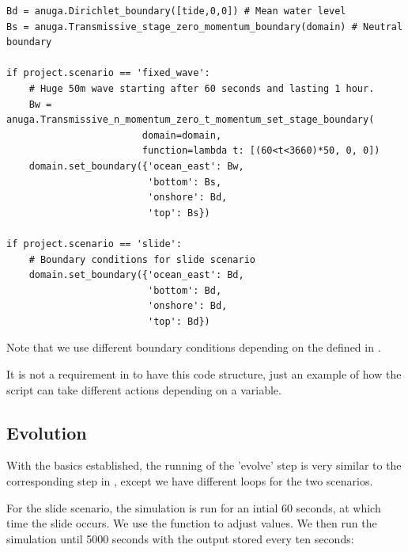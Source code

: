 \documentclass{manual}
\begin{document}
\begin{verbatim}
Bd = anuga.Dirichlet_boundary([tide,0,0]) # Mean water level
Bs = anuga.Transmissive_stage_zero_momentum_boundary(domain) # Neutral boundary

if project.scenario == 'fixed_wave':
    # Huge 50m wave starting after 60 seconds and lasting 1 hour.
    Bw = anuga.Transmissive_n_momentum_zero_t_momentum_set_stage_boundary(
                        domain=domain, 
                        function=lambda t: [(60<t<3660)*50, 0, 0])
    domain.set_boundary({'ocean_east': Bw,
                         'bottom': Bs,
                         'onshore': Bd,
                         'top': Bs})

if project.scenario == 'slide':
    # Boundary conditions for slide scenario
    domain.set_boundary({'ocean_east': Bd,
                         'bottom': Bd,
                         'onshore': Bd,
                         'top': Bd})
\end{verbatim}

Note that we use different boundary conditions depending on the 
defined in .

It is not a requirement in \anuga to have this code structure, just an example of
how the script can take different actions depending on a variable.

\subsection{Evolution}

With the basics established, the running of the 'evolve' step is
very similar to the corresponding step in , except we have different 
loops for the two scenarios.

For the slide scenario, the simulation is run for an intial 60 seconds, at which time
the slide occurs.  We use the function  to adjust 
values.  We then run the simulation until 5000 seconds with the output stored
every ten seconds:
\end{document}
